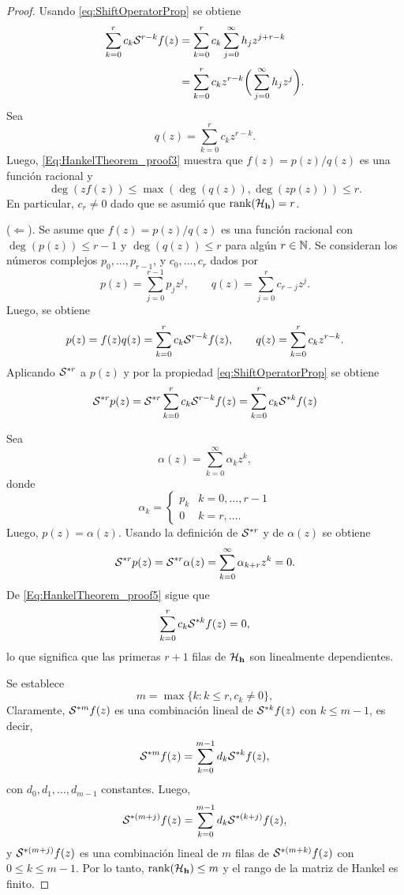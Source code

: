 \begin{proof}
			Usando \eqref{eq:ShiftOperatorProp} se obtiene
			\begin{equation}
				\begin{aligned} 
				\sum_{k=0}^{r}c_k\mathcal{S}^{r-k}f(z) & = \sum_{k=0}^rc_k\sum_{j=0}^\infty h_jz^{j+r-k}\\[0.3em]
				& = \sum_{k=0}^{r}c_kz^{r-k}\bigg(\sum_{j=0}^\infty h_jz^j\bigg).
				\end{aligned}
				\label{eq:HankelThepre_proof3}  
			\end{equation}
			Sea 
			\[q(z) = \sum_{k=0}^{r}c_kz^{r-k}.\]
			Luego, \eqref{Eq:HankelTheorem_proof3} muestra que $f(z) = p(z)/q(z)$ es una función racional y 
			\[\deg(z f(z)) \le \max(\deg(q(z)),\deg(z p(z)))\le r.\]
			En particular, $c_r\neq 0$ dado que se asumió que $\mathrm{rank}(\mathcal{H}_{\mathbf{h}}) = r$.
   
			\vspace{2mm}
   
			($\Leftarrow$). Se asume que $f(z) = p(z)/q(z)$ es una función racional con $\deg(p(z))\le r-1$ y $\deg(q(z))\le r$ para algún $r\in\mathbb{N}$. Se consideran los números complejos $p_0,\ldots,p_{r-1}$, y $c_0,\ldots,c_r$ dados por
			\[p(z) = \sum_{j=0}^{r-1}p_jz^j,\qquad q(z) = \sum_{j=0}^{r}c_{r-j}z^j. \]
			 Luego, se obtiene
			\begin{equation}
				p(z) = f(z)q(z) = \sum_{k=0}^rc_k\mathcal{S}^{r-k}f(z), \qquad q(z) = \sum_{k=0}^rc_kz^{r-k}.
				\label{Eq:HankelTheorem_proof4}
			\end{equation}
			Aplicando $\mathcal{S}^{*r}$ a $p(z)$ y por la propiedad \eqref{eq:ShiftOperatorProp} se obtiene
			\begin{equation}
				\mathcal{S}^{*r}p(z) = \mathcal{S}^{*r}\sum_{k=0}^rc_k\mathcal{S}^{r-k}f(z) = \sum_{k=0}^rc_k\mathcal{S}^{*k}f(z)
				\label{Eq:HankelTheorem_proof5}
			\end{equation}
			
			Sea \[\alpha(z) = \sum_{k=0}^{\infty}\alpha_kz^k,\]
			donde 
			\[\alpha_k =\begin{cases}p_k & k = 0,\ldots,r-1\\[0.3em]
			0 & k= r,\ldots .
			\end{cases}\]
			Luego, $p(z) = \alpha(z)$. Usando la definición de $\mathcal{S}^{*r}$ y de $\alpha(z)$ se obtiene
			\[\mathcal{S}^{*r}p(z)=\mathcal{S}^{*r}\alpha(z) = \sum_{k=0}^{\infty}\alpha_{k+r}z^k = 0.\]
			De \eqref{Eq:HankelTheorem_proof5} sigue que
			\[\sum_{k=0}^{r}c_k\mathcal{S}^{*k}f(z) = 0,\]
			lo que significa que las primeras $r+1$ filas de $\mathcal{H}_{\mathbf{h}}$ son linealmente dependientes.
			
			
			Se establece
			\begin{equation}
				m = \max\{k : k\le r,c_k\neq 0\},
			\end{equation}
			Claramente, $\mathcal{S}^{*m}f(z)$ es una combinación lineal de $\mathcal{S}^{*k}f(z)$ con $k\le m-1$, es decir,
			\[\mathcal{S}^{*m}f(z) = \sum_{k=0}^{m-1}d_k\mathcal{S}^{*k}f(z),\]
			con $d_0, d_1, \ldots, d_{m-1}$ constantes. Luego,
			\[\mathcal{S}^{*(m+j)}f(z) = \sum_{k=0}^{m-1}d_k\mathcal{S}^{*(k+j)}f(z),\]
			y $\mathcal{S}^{*(m+j)}f(z)$ es una combinación lineal de $m$ filas de $\mathcal{S}^{*(m+k)}f(z)$ con $0\le k\le m-1$. Por lo tanto, $\mathrm{rank}(\mathcal{H}_{\mathbf{h}})\le m$ y el rango de la matriz de Hankel es finito.
		\end{proof}


